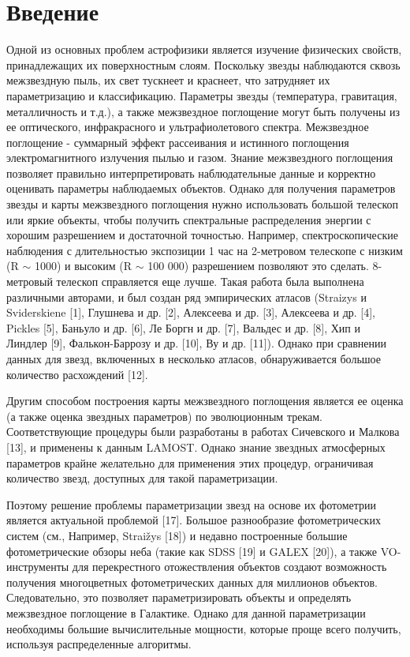 \documentclass[12pt, a4paper]{article}
\begin{document}
	\section{Введение}
	Одной из основных проблем астрофизики является изучение физических свойств, принадлежащих их поверхностным слоям. Поскольку звезды наблюдаются сквозь межзвездную пыль, их свет тускнеет и краснеет, что затрудняет их параметризацию и классификацию. Параметры звезды (температура, гравитация, металличность и т.д.), а также межзвездное поглощение могут быть получены из ее оптического, инфракрасного и ультрафиолетового спектра. Межзвездное поглощение - суммарный эффект рассеивания и истинного поглощения электромагнитного излучения пылью и газом. Знание межзвездного поглощения позволяет правильно интерпретировать наблюдательные данные и корректно оценивать параметры наблюдаемых объектов. Однако для получения параметров звезды и карты межзвездного поглощения нужно использовать большой телескоп или яркие объекты, чтобы получить спектральные распределения энергии с хорошим разрешением и достаточной точностью. Например, спектроскопические наблюдения с длительностью экспозиции 1 час на 2-метровом телескопе с низким (R $\sim$ 1000) и высоким (R $\sim$ 100 000) разрешением позволяют это сделать. 8-метровый телескоп справляется еще лучше. Такая работа была выполнена различными авторами, и был создан ряд эмпирических атласов (Straizys и Sviderskiene [1], Глушнева и др. [2], Алексеева и др. [3], Алексеева и др. [4], Pickles [5], Баньуло и др. [6], Ле Боргн и др. [7], Вальдес и др. [8], Хип и Линдлер [9], Фалькон-Баррозу и др. [10], Ву и др. [11]). Однако при сравнении данных для звезд, включенных в несколько атласов, обнаруживается большое количество расхождений [12].

	Другим способом построения карты межзвездного поглощения является ее оценка (а также оценка звездных параметров) по эволюционным трекам. Соответствующие процедуры были разработаны в работах Сичевского и Малкова [13], и применены к данным LAMOST. Однако знание звездных атмосферных параметров крайне желательно для применения этих процедур, ограничивая количество звезд, доступных для такой параметризации.

	Поэтому решение проблемы параметризации звезд на основе их фотометрии является актуальной проблемой [17]. Большое разнообразие фотометрических систем (см., Например, Straižys [18]) и недавно построенные большие фотометрические обзоры неба (такие как SDSS [19] и GALEX [20]), а также VO-инструменты для перекрестного отожествления объектов  создают возможность получения многоцветных фотометрических данных для миллионов объектов. Следовательно, это позволяет параметризировать объекты и определять межзвездное поглощение в Галактике. Однако для данной параметризации необходимы большие вычислительные мощности, которые проще всего получить, используя распределенные алгоритмы.
\end{document}
